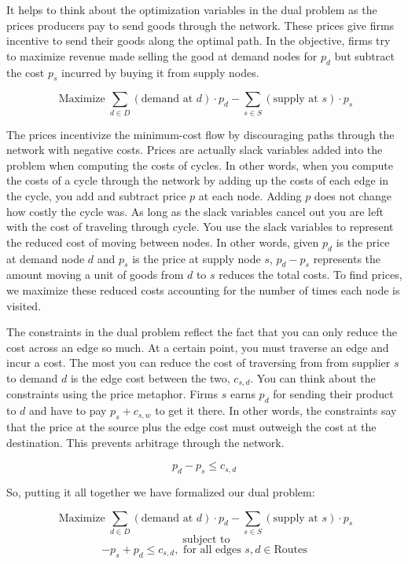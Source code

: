 \documentclass{report}
\begin{document}
It helps to think about the optimization variables in the dual problem as the prices producers pay to send goods through the network. These prices give firms incentive to send their goods along the optimal path. In the objective, firms try to maximize revenue made selling the good at demand nodes for $p_d$ but subtract the cost $p_s$ incurred by buying it from supply nodes.  

$$\operatorname{Maximize} \sum_{d \in D}  (\text{demand at } d) \cdot p_{d} -   \sum_{s \in S}  (\text{supply at } s) \cdot p_{s} $$

The prices incentivize the minimum-cost flow by discouraging paths through the network with negative costs. Prices are actually slack variables added into the problem when computing the costs of cycles. In other words, when you compute the costs of a cycle through the network by adding up the costs of each edge in the cycle, you add and subtract price $p$ at each node. Adding $p$ does not change how costly the cycle was. As long as the slack variables cancel out you are left with the cost of traveling through cycle. You use the slack variables to represent the reduced cost of moving between nodes. In other words, given $p_d$ is the price at demand node $d$ and $p_s$ is the price at supply node $s$, $p_d - p_s$ represents the amount moving a unit of goods from $d$ to $s$ reduces the total costs. To find prices, we maximize these reduced costs accounting for the number of times each node is visited. 

The constraints in the dual problem reflect the fact that you can only reduce the cost across an edge so much. At a certain point, you must traverse an edge and incur a cost. The most you can reduce the cost of traversing from from supplier $s$ to demand $d$ is the edge cost between the two, $c_{s,d}$. You can think about the constraints using the price metaphor. Firms $s$ earns $p_d$ for sending their product to $d$ and have to pay $p_s + c_{s,w}$ to get it there. In other words, the constraints say that the price at the source plus the edge cost must outweigh the cost at the destination. This prevents arbitrage through the network.

$$ p_d -p_s  \leq c_{s,d}$$

So, putting it all together we have formalized our dual problem:

$$\operatorname{Maximize} \sum_{d \in D}  (\text{demand at } d) \cdot p_{d} -   \sum_{s \in S}  (\text{supply at } s) \cdot p_{s} $$
$$ \text{ subject to}$$
$$ -p_s + p_d \leq c_{s,d},  \text{ for all edges }  s,d\in \textrm{Routes}$$
\end{document}
